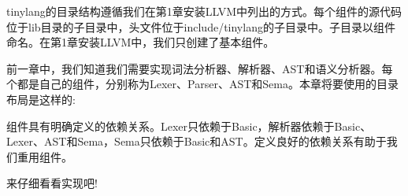 tinylang的目录结构遵循我们在第1章安装LLVM中列出的方式。每个组件的源代码位于lib目录的子目录中，头文件位于include/tinylang的子目录中。子目录以组件命名。在第1章安装LLVM中，我们只创建了基本组件。

前一章中，我们知道我们需要实现词法分析器、解析器、AST和语义分析器。每个都是自己的组件，分别称为Lexer、Parser、AST和Sema。本章将要使用的目录布局是这样的:


组件具有明确定义的依赖关系。Lexer只依赖于Basic，解析器依赖于Basic、Lexer、AST和Sema，Sema只依赖于Basic和AST。定义良好的依赖关系有助于我们重用组件。

来仔细看看实现吧!